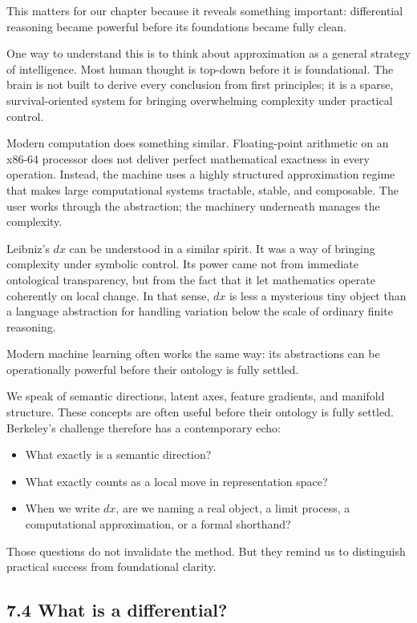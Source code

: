 This matters for our chapter because it reveals something important:
differential reasoning became powerful before its foundations became
fully clean.

One way to understand this is to think about approximation as a general
strategy of intelligence. Most human thought is top-down before it is
foundational. The brain is not built to derive every conclusion from
first principles; it is a sparse, survival-oriented system for bringing
overwhelming complexity under practical control.

Modern computation does something similar. Floating-point arithmetic on
an x86-64 processor does not deliver perfect mathematical exactness in
every operation. Instead, the machine uses a highly structured
approximation regime that makes large computational systems tractable,
stable, and composable. The user works through the abstraction; the
machinery underneath manages the complexity.

Leibniz's \(dx\) can be understood in a similar spirit. It was a way of
bringing complexity under symbolic control. Its power came not from
immediate ontological transparency, but from the fact that it let
mathematics operate coherently on local change. In that sense, \(dx\) is
less a mysterious tiny object than a language abstraction for handling
variation below the scale of ordinary finite reasoning.

Modern machine learning often works the same way: its abstractions can
be operationally powerful before their ontology is fully settled.

We speak of semantic directions, latent axes, feature gradients, and
manifold structure. These concepts are often useful before their
ontology is fully settled. Berkeley's challenge therefore has a
contemporary echo:

\begin{itemize}
\tightlist
\item
  What exactly is a semantic direction?
\item
  What exactly counts as a local move in representation space?
\item
  When we write \(dx\), are we naming a real object, a limit process, a
  computational approximation, or a formal shorthand?
\end{itemize}

Those questions do not invalidate the method. But they remind us to
distinguish practical success from foundational clarity.

\hypertarget{what-is-a-differential}{%
\subsection{7.4 What is a differential?}\label{what-is-a-differential}}


